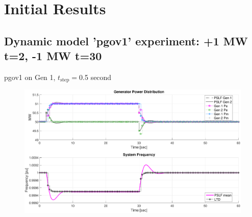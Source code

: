 \documentclass[14pt, unknownkeysallowed]{beamer}
\begin{document}
\section{Initial Results}
\subsection{Dynamic model 'pgov1' experiment: +1 MW t=2, -1 MW t=30}

\begin{frame}
pgov1 on Gen 1, $t_\text{step}=$0.5 second
\begin{figure}
\includegraphics[width=\linewidth]{pgov1IAB}%
\end{figure}
\end{frame}
\end{document}
